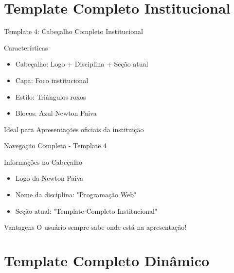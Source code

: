 \documentclass[aspectratio=169]{beamer}
\begin{document}
\section{Template Completo Institucional}

\begin{frame}{Template 4: Cabeçalho Completo Institucional}
    \begin{block}{Características}
        \begin{itemize}
            \item Cabeçalho: Logo + Disciplina + Seção atual
            \item Capa: Foco institucional
            \item Estilo: Triângulos roxos
            \item Blocos: Azul Newton Paiva
        \end{itemize}
    \end{block}
    
    \begin{alertblock}{Ideal para}
        Apresentações oficiais da instituição
    \end{alertblock}
\end{frame}

\begin{frame}{Navegação Completa - Template 4}
    \begin{block}{Informações no Cabeçalho}
        \begin{itemize}
            \item Logo da Newton Paiva
            \item Nome da disciplina: "Programação Web"
            \item Seção atual: "Template Completo Institucional"
        \end{itemize}
    \end{block}
    
    \begin{exampleblock}{Vantagens}
        O usuário sempre sabe onde está na apresentação!
    \end{exampleblock}
\end{frame}


\section{Template Completo Dinâmico}
\end{document}
